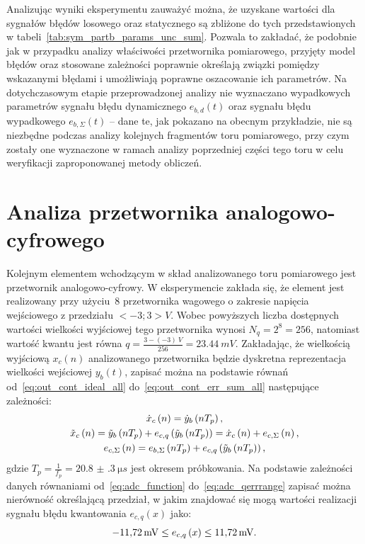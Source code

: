 Analizując wyniki eksperymentu zauważyć można, że uzyskane wartości dla sygnałów błędów losowego oraz statycznego są zbliżone do tych przedstawionych w tabeli~\ref{tab:sym_partb_params_unc_sum}. Pozwala to zakładać, że podobnie jak w przypadku analizy właściwości przetwornika pomiarowego, przyjęty model błędów oraz stosowane zależności poprawnie określają związki pomiędzy wskazanymi błędami i umożliwiają poprawne oszacowanie ich parametrów. Na dotychczasowym etapie przeprowadzonej analizy nie wyznaczano wypadkowych parametrów sygnału błędu dynamicznego $e_{b,d}(t)$ oraz sygnału błędu wypadkowego $e_{b,\Sigma}(t)$ -- dane te, jak pokazano na obecnym przykładzie, nie są niezbędne podczas analizy kolejnych fragmentów toru pomiarowego, przy czym zostały one wyznaczone w ramach analizy poprzedniej części tego toru w celu weryfikacji zaproponowanej metody obliczeń.

\section{Analiza przetwornika analogowo-cyfrowego}

Kolejnym elementem wchodzącym w skład analizowanego toru pomiarowego jest przetwornik analogowo-cyfrowy. W eksperymencie zakłada się, że element jest realizowany przy użyciu~\qty{8}{\bitOwego} przetwornika wagowego o zakresie napięcia wejściowego z przedziału $<-3;3>\unit{V}$. Wobec powyższych liczba dostępnych wartości wielkości wyjściowej tego przetwornika wynosi $N_{q} = 2^{8} = 256$, natomiast wartość kwantu jest równa $q = \frac{3 - (-3)~\unit{V}}{256} = \qty{23.44}{mV}$. Zakładając, że wielkością wyjściową $x_{c}(n)$ analizowanego przetwornika będzie dyskretna reprezentacja wielkości wejściowej $y_{b}(t)$, zapisać można na podstawie równań od~\eqref{eq:out_cont_ideal_all} do~\eqref{eq:out_cont_err_sum_all} następujące zależności:
\begin{gather}
\dot{x}_{c} \left(n\right) = \dot{y}_{b} \left(nT_{p}\right) \label{eq:sym_partc_out_ideal}, \\
\tilde{x}_{c} \left(n\right) = \tilde{y}_{b} \left(nT_{p}\right) + e_{c,q} \left( \tilde{y}_{b} \left(nT_{p}\right) \right) = \dot{x}_{c} \left(n\right) + e_{c,\Sigma} \left(n\right) \label{eq:sym_partc_out_real}, \\
e_{c,\Sigma} \left(n\right) = e_{b,\Sigma} \left(nT_{p}\right) + e_{c,q} \left( \tilde{y}_{b} \left(nT_{p}\right) \right) \label{eq:sym_partc_error_sum},
\end{gather}
gdzie $T_{p} = \frac{1}{f_{p}} = \qty{20.8(3)}{\micro s}$ jest okresem próbkowania. Na podstawie zależności danych równaniami od~\eqref{eq:adc_function} do~\eqref{eq:adc_qerrrange} zapisać można nierówność określającą przedział, w jakim znajdować się mogą wartości realizacji sygnału błędu kwantowania $e_{c,q}(x)$ jako:
\begin{equation}
\qty{-11.72}{mV} \le e_{c,q} \left(x\right) \le \qty{11.72}{mV} \label{eq:sym_partc_error_quant}.
\end{equation}

